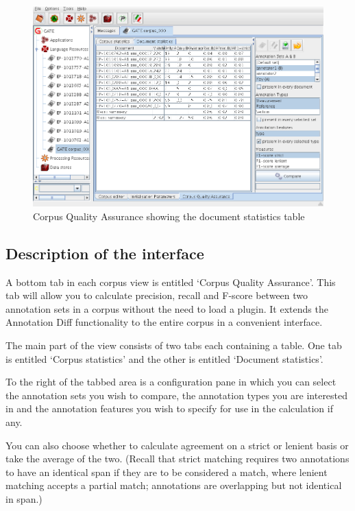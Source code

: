 \begin{figure}[htbp]
\begin{center}
\includegraphics[width=14cm]{corpusqa.png}
\end{center}
\caption{Corpus Quality Assurance showing the document statistics table}
\label{fig:corpusqa}
\end{figure}

\subsection{Description of the interface}

A bottom tab in each corpus view is entitled `Corpus Quality
Assurance'. This tab will allow you to calculate precision, recall and F-score
between two annotation sets in a corpus without the need to load a plugin. It
extends the Annotation Diff functionality to the entire corpus in a convenient
interface.

The main part of the view consists of two tabs each containing a table. One tab
is entitled `Corpus statistics' and the other is entitled `Document
statistics'.

To the right of the tabbed area is a configuration pane in which
you can select the annotation sets you wish to compare, the annotation types
you are interested in and the annotation features you wish to specify for use
in the calculation if any.

You can also choose whether to calculate agreement
on a strict or lenient basis or take the average of the two. (Recall that strict
matching requires two annotations to have an identical span if they are to be
considered a match, where lenient matching accepts a partial match; annotations
are overlapping but not identical in span.)

